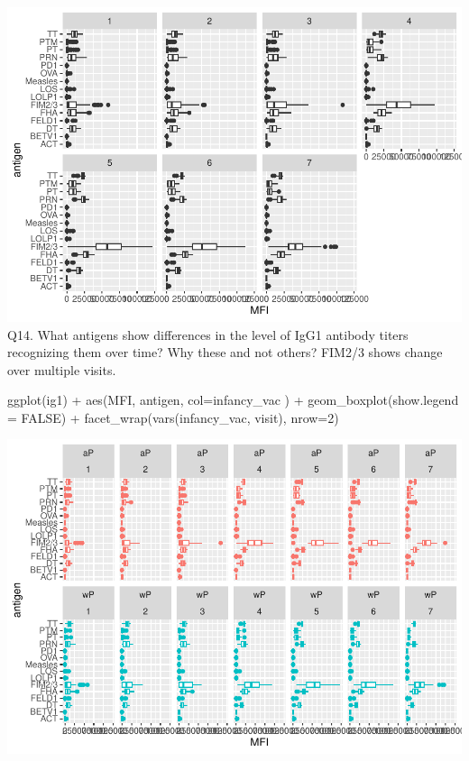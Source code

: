 \documentclass[
]{article}
\newenvironment{Shaded}{\begin{snugshade}}{\end{snugshade}}
\newcommand{\AttributeTok}[1]{\textcolor[rgb]{0.77,0.63,0.00}{#1}}
\newcommand{\ConstantTok}[1]{\textcolor[rgb]{0.00,0.00,0.00}{#1}}
\newcommand{\DecValTok}[1]{\textcolor[rgb]{0.00,0.00,0.81}{#1}}
\newcommand{\FunctionTok}[1]{\textcolor[rgb]{0.00,0.00,0.00}{#1}}
\newcommand{\NormalTok}[1]{#1}
\newcommand{\SpecialCharTok}[1]{\textcolor[rgb]{0.00,0.00,0.00}{#1}}
\begin{document}
\includegraphics{lab-19-143_files/figure-latex/unnamed-chunk-24-1.pdf}
Q14. What antigens show differences in the level of IgG1 antibody titers
recognizing them over time? Why these and not others? FIM2/3 shows
change over multiple visits.

\begin{Shaded}
\begin{Highlighting}[]
\FunctionTok{ggplot}\NormalTok{(ig1) }\SpecialCharTok{+}
  \FunctionTok{aes}\NormalTok{(MFI, antigen, }\AttributeTok{col=}\NormalTok{infancy\_vac ) }\SpecialCharTok{+}
  \FunctionTok{geom\_boxplot}\NormalTok{(}\AttributeTok{show.legend =} \ConstantTok{FALSE}\NormalTok{) }\SpecialCharTok{+} 
  \FunctionTok{facet\_wrap}\NormalTok{(}\FunctionTok{vars}\NormalTok{(infancy\_vac, visit), }\AttributeTok{nrow=}\DecValTok{2}\NormalTok{)}
\end{Highlighting}
\end{Shaded}

\includegraphics{lab-19-143_files/figure-latex/unnamed-chunk-25-1.pdf}
\end{document}
